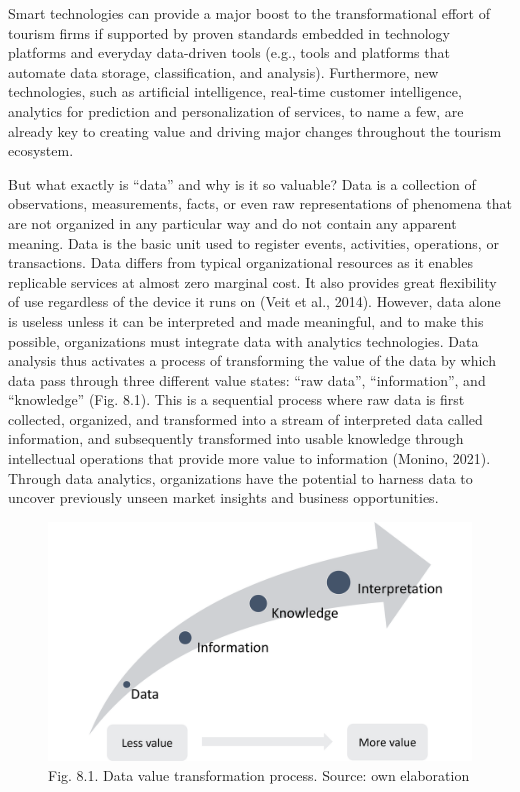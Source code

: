 \documentclass[
  letterpaper,
  DIV=11,
  numbers=noendperiod]{scrreprt}
\begin{document}
Smart technologies can provide a major boost to the transformational
effort of tourism firms if supported by proven standards embedded in
technology platforms and everyday data-driven tools (e.g., tools and
platforms that automate data storage, classification, and analysis).
Furthermore, new technologies, such as artificial intelligence,
real-time customer intelligence, analytics for prediction and
personalization of services, to name a few, are already key to creating
value and driving major changes throughout the tourism ecosystem.

But what exactly is ``data'' and why is it so valuable? Data is a
collection of observations, measurements, facts, or even raw
representations of phenomena that are not organized in any particular
way and do not contain any apparent meaning. Data is the basic unit used
to register events, activities, operations, or transactions. Data
differs from typical organizational resources as it enables replicable
services at almost zero marginal cost. It also provides great
flexibility of use regardless of the device it runs on (Veit et al.,
2014). However, data alone is useless unless it can be interpreted and
made meaningful, and to make this possible, organizations must integrate
data with analytics technologies. Data analysis thus activates a process
of transforming the value of the data by which data pass through three
different value states: ``raw data'', ``information'', and ``knowledge''
(Fig. 8.1). This is a sequential process where raw data is first
collected, organized, and transformed into a stream of interpreted data
called information, and subsequently transformed into usable knowledge
through intellectual operations that provide more value to information
(Monino, 2021). Through data analytics, organizations have the potential
to harness data to uncover previously unseen market insights and
business opportunities.

\begin{figure}

{\centering \includegraphics{img/fig7.png}

}

\caption{Fig. 8.1. Data value transformation process. Source: own
elaboration}

\end{figure}
\end{document}
